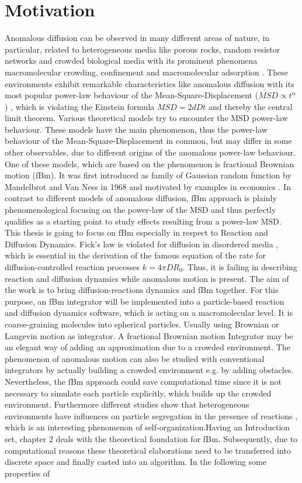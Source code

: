 \documentclass[
  a4paper,BCOR10mm,oneside,
  bibtotoc,idxtotoc,
  headsepline,footsepline,%
  fleqn,openbib
]{scrbook}
\begin{document}
\chapter{Motivation}
Anomalous diffusion can be observed in many different areas of nature, in particular, related to heterogeneous media like porous rocks, random resistor networks and crowded biological media with its prominent phenomena macromolecular crowding, confinement and macromolecular adsorption \cite{Minton2006}. These environments exhibit remarkable characteristics like anomalous diffusion with its most popular power-law behaviour of the Mean-Square-Displacement ($MSD\propto t^{\alpha}$) \cite{Hofling2013}, which is violating the Einstein formula $MSD=2 d D t$ and thereby the central limit theorem. Various theoretical models try to encounter the  MSD power-law behaviour. These models have the main phenomenon, thus the power-law behaviour of the Mean-Square-Displacement in common, but may differ in some other observables, due to different origins of the anomalous power-law behaviour. One of these models, which are based on the phenomenon is fractional Brownian motion (fBm). It was first introduced as family of Gaussian random function by Mandelbrot and Van Ness in 1968 and motivated by examples in economics \cite{Mandelbrot1968}. In contrast to different models of anomalous diffusion, fBm approach is plainly phenomenological focusing on the power-law of the MSD and thus perfectly qualifies as a starting point to study effects resulting from a power-law MSD. \newline This thesis is going to focus on fBm especially in respect to Reaction and Diffusion Dynamics. Fick’s law is violated for diffusion in disordered media \cite{Havlin1987}, which is essential in the derivation of the famous equation of the rate for diffusion-controlled reaction processes $k=4 \pi D R_0$. Thus, it is failing in describing reaction and diffusion dynamics while anomalous motion is present. The aim of the work is to bring diffusion-reactions dynamics and fBm together. For this purpose, an fBm integrator will be implemented into a particle-based reaction and diffusion dynamics software, which is acting on a macromolecular level. It is coarse-graining molecules into spherical particles. Usually using Brownian or Langevin motion as integrator. A fractional Brownian motion Integrator may be an elegant way of adding an approximation due to a crowded environment. The phenomenon of anomalous motion can also be studied with conventional integrators by actually building a crowded environment e.g. by adding obstacles. Nevertheless, the fBm approach could save computational time since it is not necessary to simulate each particle explicitly, which builds up the crowded environment. Furthermore different studies show that heterogeneous environments have influences on particle segregation in the presence of reactions \cite{Berry2002}, which is an interesting phenomenon of self-organization.\newpage \noindent Having an Introduction set, chapter 2 deals with the theoretical foundation for fBm. Subsequently, due to computational reasons these theoretical elaborations need to be transferred into discrete space and finally casted into an algorithm. In the following some properties of 
\end{document}
